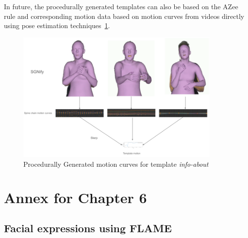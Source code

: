 \documentclass[../main.tex]{subfiles}
\begin{document}
In future, the procedurally generated templates can also be based on the AZee rule and corresponding motion data based on motion curves from videos directly using pose estimation techniques~\ref{fig:motion_curves_template_procedural_pose_est}.

\begin{figure}
    \centering \includegraphics[width = 4in]{chapters/intermediate_blocks_pose_correction/images/motion_curves_template_procedural_pose_est.png}
    \caption{Procedurally Generated motion curves for template \emph{info-about}}
    \label{fig:motion_curves_template_procedural_pose_est}
\end{figure}

\section{Annex for Chapter 6}
\label{app:facial_expressions}

\subsection{Facial expressions using FLAME}
\label{app:facial_expressions:flame}
\end{document}
